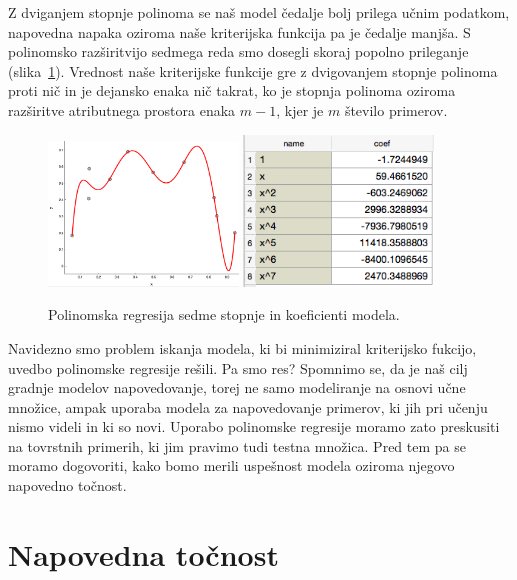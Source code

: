 Z dviganjem stopnje polinoma se naš model čedalje bolj prilega učnim podatkom, napovedna napaka oziroma naše kriterijska funkcija pa je čedalje manjša. S polinomsko razširitvijo sedmega reda smo dosegli skoraj popolno prileganje (slika~\ref{fig:poly-linear-fit7}). Vrednost naše kriterijske funkcije gre z dvigovanjem stopnje polinoma proti nič in je dejansko enaka nič takrat, ko je stopnja polinoma oziroma razširitve atributnega prostora enaka $m-1$, kjer je $m$ število primerov.

\begin{figure}[htbp]
\begin{center}
  \includegraphics[width=0.45\textwidth]{slike/poly-reg-7.png}
  \hfill
  \includegraphics[width=0.45\textwidth]{slike/poly-reg-7-coeff.png}
\caption{Polinomska regresija sedme stopnje in koeficienti modela.}
\label{fig:poly-linear-fit7}
\end{center}
\end{figure}

Navidezno smo problem iskanja modela, ki bi minimiziral kriterijsko fukcijo,  uvedbo polinomske regresije rešili. Pa smo res? Spomnimo se, da je naš cilj gradnje modelov napovedovanje, torej ne samo modeliranje na osnovi učne množice, ampak uporaba modela za napovedovanje primerov, ki jih pri učenju nismo videli in ki so novi. Uporabo polinomske regresije moramo zato preskusiti na tovrstnih primerih, ki jim pravimo tudi testna množica. Pred tem pa se moramo dogovoriti, kako bomo merili uspešnost modela oziroma njegovo napovedno točnost.

\section{Napovedna točnost}

